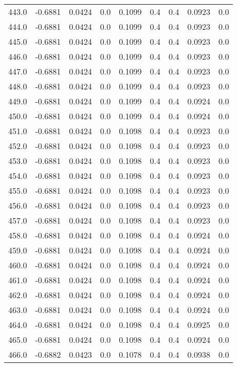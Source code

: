 \begin{longtable}{lrrrrrrrr}
443.0 & -0.6881 & 0.0424 & 0.0 & 0.1099 & 0.4 & 0.4 & 0.0923 & 0.0 \\
444.0 & -0.6881 & 0.0424 & 0.0 & 0.1099 & 0.4 & 0.4 & 0.0923 & 0.0 \\
445.0 & -0.6881 & 0.0424 & 0.0 & 0.1099 & 0.4 & 0.4 & 0.0923 & 0.0 \\
446.0 & -0.6881 & 0.0424 & 0.0 & 0.1099 & 0.4 & 0.4 & 0.0923 & 0.0 \\
447.0 & -0.6881 & 0.0424 & 0.0 & 0.1099 & 0.4 & 0.4 & 0.0923 & 0.0 \\
448.0 & -0.6881 & 0.0424 & 0.0 & 0.1099 & 0.4 & 0.4 & 0.0923 & 0.0 \\
449.0 & -0.6881 & 0.0424 & 0.0 & 0.1099 & 0.4 & 0.4 & 0.0924 & 0.0 \\
450.0 & -0.6881 & 0.0424 & 0.0 & 0.1099 & 0.4 & 0.4 & 0.0924 & 0.0 \\
451.0 & -0.6881 & 0.0424 & 0.0 & 0.1098 & 0.4 & 0.4 & 0.0923 & 0.0 \\
452.0 & -0.6881 & 0.0424 & 0.0 & 0.1098 & 0.4 & 0.4 & 0.0923 & 0.0 \\
453.0 & -0.6881 & 0.0424 & 0.0 & 0.1098 & 0.4 & 0.4 & 0.0923 & 0.0 \\
454.0 & -0.6881 & 0.0424 & 0.0 & 0.1098 & 0.4 & 0.4 & 0.0923 & 0.0 \\
455.0 & -0.6881 & 0.0424 & 0.0 & 0.1098 & 0.4 & 0.4 & 0.0923 & 0.0 \\
456.0 & -0.6881 & 0.0424 & 0.0 & 0.1098 & 0.4 & 0.4 & 0.0923 & 0.0 \\
457.0 & -0.6881 & 0.0424 & 0.0 & 0.1098 & 0.4 & 0.4 & 0.0923 & 0.0 \\
458.0 & -0.6881 & 0.0424 & 0.0 & 0.1098 & 0.4 & 0.4 & 0.0924 & 0.0 \\
459.0 & -0.6881 & 0.0424 & 0.0 & 0.1098 & 0.4 & 0.4 & 0.0924 & 0.0 \\
460.0 & -0.6881 & 0.0424 & 0.0 & 0.1098 & 0.4 & 0.4 & 0.0924 & 0.0 \\
461.0 & -0.6881 & 0.0424 & 0.0 & 0.1098 & 0.4 & 0.4 & 0.0924 & 0.0 \\
462.0 & -0.6881 & 0.0424 & 0.0 & 0.1098 & 0.4 & 0.4 & 0.0924 & 0.0 \\
463.0 & -0.6881 & 0.0424 & 0.0 & 0.1098 & 0.4 & 0.4 & 0.0924 & 0.0 \\
464.0 & -0.6881 & 0.0424 & 0.0 & 0.1098 & 0.4 & 0.4 & 0.0925 & 0.0 \\
465.0 & -0.6881 & 0.0424 & 0.0 & 0.1098 & 0.4 & 0.4 & 0.0924 & 0.0 \\
466.0 & -0.6882 & 0.0423 & 0.0 & 0.1078 & 0.4 & 0.4 & 0.0938 & 0.0 \\

\end{longtable}
